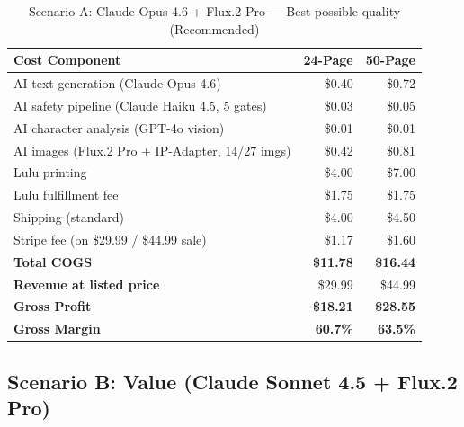 \documentclass[12pt, letterpaper, oneside]{book}
\begin{document}
\begin{table}[H]
\centering
\begin{tabular}{lrr}
\toprule
\textbf{Cost Component} & \textbf{24-Page} & \textbf{50-Page} \\
\midrule
AI text generation (Claude Opus 4.6) & \$0.40 & \$0.72 \\
AI safety pipeline (Claude Haiku 4.5, 5 gates) & \$0.03 & \$0.05 \\
AI character analysis (GPT-4o vision) & \$0.01 & \$0.01 \\
AI images (Flux.2 Pro + IP-Adapter, 14/27 imgs) & \$0.42 & \$0.81 \\
Lulu printing & \$4.00 & \$7.00 \\
Lulu fulfillment fee & \$1.75 & \$1.75 \\
Shipping (standard) & \$4.00 & \$4.50 \\
Stripe fee (on \$29.99 / \$44.99 sale) & \$1.17 & \$1.60 \\
\midrule
\textbf{Total COGS} & \textbf{\$11.78} & \textbf{\$16.44} \\
\textbf{Revenue at listed price} & \$29.99 & \$44.99 \\
\textbf{Gross Profit} & \textcolor{success}{\textbf{\$18.21}} & \textcolor{success}{\textbf{\$28.55}} \\
\textbf{Gross Margin} & \textcolor{success}{\textbf{60.7\%}} & \textcolor{success}{\textbf{63.5\%}} \\
\bottomrule
\end{tabular}
\caption{Scenario A: Claude Opus 4.6 + Flux.2 Pro --- Best possible quality (Recommended)}
\end{table}

\subsection{Scenario B: Value (Claude Sonnet 4.5 + Flux.2 Pro)}
\end{document}
